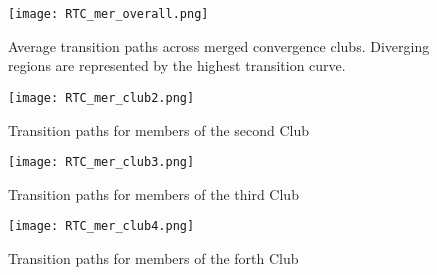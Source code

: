 \documentclass[11pt]{article}
\begin{document}
\begin{figure}%
\centering 
  {\texttt{[image: RTC\_mer\_overall.png]} }
  \caption{Average transition paths across merged convergence clubs. Diverging regions are represented by the highest transition curve.}
  \label{paths_overall}
  \end{figure}



\begin{figure}%
    \centering
    \texttt{[image: RTC\_mer\_club2.png]}
    \caption{Transition paths for members of the second Club}
    \label{paths2}
\end{figure}


\begin{figure}%
    \centering
    \texttt{[image: RTC\_mer\_club3.png]}
    \caption{Transition paths for members of the third Club}
    \label{paths3}
\end{figure}

\begin{figure}%
    \centering
    \texttt{[image: RTC\_mer\_club4.png]}
    \caption{Transition paths for members of the forth Club}
    \label{paths4}
\end{figure}
\end{document}
